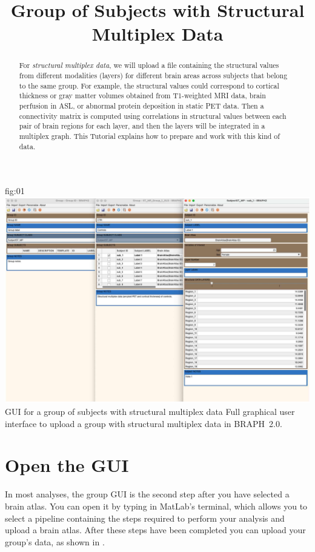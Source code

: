 \documentclass[justified]{tufte-handout}
\title{Group of Subjects with Structural Multiplex Data}
\begin{document}
\maketitle

\begin{abstract}
\noindent
For \emph{structural multiplex data}, we will upload a file containing the structural values from different modalities (layers) for different brain areas across subjects that belong to the same group. For example, the structural values could correspond to cortical thickness or gray matter volumes obtained from T1-weighted MRI data, brain perfusion in ASL, or abnormal protein deposition in static PET data. Then a connectivity matrix is computed using correlations in structural values between each pair of brain regions for each layer, and then the layers will be integrated in a multiplex graph. This Tutorial explains how to prepare and work with this kind of data.
\end{abstract}

\tableofcontents

	{fig:01}
	{\includegraphics{fig01.jpg}}
	{GUI for a group of subjects with structural multiplex data}
	{
	Full graphical user interface to upload a group with structural multiplex data in BRAPH~2.0. 
	}

\clearpage
\section{Open the GUI}

In most analyses, the group GUI is the second step after you have selected a brain atlas. You can open it by typing  in MatLab's terminal, which allows you to select a pipeline containing the steps required to perform your analysis and upload a brain atlas. After these steps have been completed you can upload your group's data, as shown in .
\end{document}
